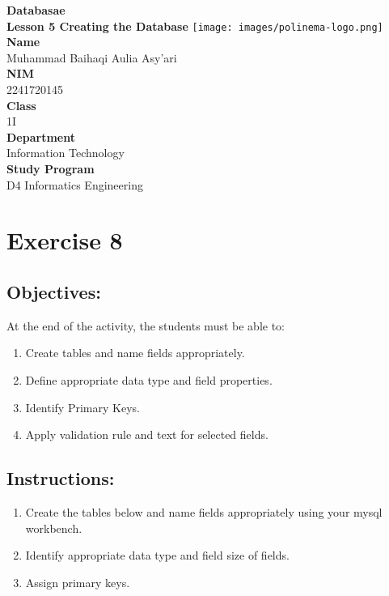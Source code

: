 \documentclass[12pt,titlepage]{article}
\newcommand{\vSubject}{Databasae}
\newcommand{\vSubtitle}{Lesson 5}
\newcommand{\vSubsubtitle}{Creating the Database}
\newcommand{\vName}{Muhammad Baihaqi Aulia Asy'ari}
\newcommand{\vNIM}{2241720145}
\newcommand{\vClass}{1I}
\newcommand{\vDepartment}{Information Technology}
\newcommand{\vStudyProgram}{D4 Informatics Engineering}
\begin{document}
\begin{titlepage}
    \centering
    \vfill
    {\bfseries\LARGE
        \vSubject\\
        \vskip0.25cm
        \vSubtitle
        \vskip0.25cm
        \vSubsubtitle
    }
    \vfill
    \texttt{[image: images/polinema-logo.png]}
    \vfill
    {
        \textbf{Name}\\
        \vName\\
        \vskip0.5cm
        \textbf{NIM}\\
        \vNIM\\
        \vskip0.5cm
        \textbf{Class}\\
        \vClass\\
        \vskip0.5cm
        \textbf{Department}\\
        \vDepartment\\
        \vskip0.5cm
        \textbf{Study Program}\\
        \vStudyProgram
    }
\end{titlepage}

\newpage

\section*{Exercise 8}

\subsection*{Objectives:} At the end of the activity, the students must be able to:

\begin{enumerate}
    \item Create tables and name fields appropriately.
    \item Define appropriate data type and field properties.
    \item Identify Primary Keys.
    \item Apply validation rule and text for selected fields.
\end{enumerate}

\subsection*{Instructions:}

\begin{enumerate}
    \item Create the tables below and name fields appropriately using your mysql workbench.
    \item Identify appropriate data type and field size of fields.
    \item Assign primary keys.
\end{enumerate}
\end{document}
